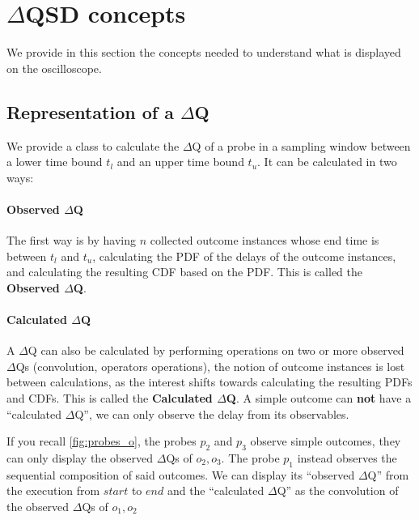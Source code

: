 \section{$\Delta$QSD concepts}

    We provide in this section the concepts needed to understand what is displayed on the oscilloscope.

\subsection{Representation of a $\Delta$Q}
    We provide a class to calculate the $\Delta$Q of a probe in a sampling window between a lower time bound $t_l$ and an upper time bound $t_u$. It can be calculated in two ways: 
    
    \paragraph{Observed $\Delta$Q}
    
    The first way is by having $n$ collected outcome instances whose end time is between $t_l$ and $t_u$, calculating the PDF of the delays of the outcome instances, and calculating the resulting CDF based on the PDF. This is called the \textbf{Observed $\Delta$Q}.
    
    \paragraph{Calculated $\Delta$Q}
    
    A $\Delta$Q can also be calculated by performing operations on two or more observed $\Delta$Qs (convolution, operators operations), the notion of outcome instances is lost between calculations, as the interest shifts towards calculating the resulting PDFs and CDFs. This is called the \textbf{Calculated $\Delta$Q}. A simple outcome can \textbf{not} have a ``calculated $\Delta$Q'', we can only observe the delay from its observables.

    If you recall \cref{fig:probes_o}, the probes $p_2$ and $p_3$ observe simple outcomes, they can only display the observed $\Delta$Qs of $o_2, o_3$. The probe $p_1$ instead observes the sequential composition of said outcomes. We can display its ``observed $\Delta$Q'' from the execution from $start$ to $end$ and the ``calculated $\Delta$Q'' as the convolution of the observed $\Delta$Qs of $o_1, o_2$
        
